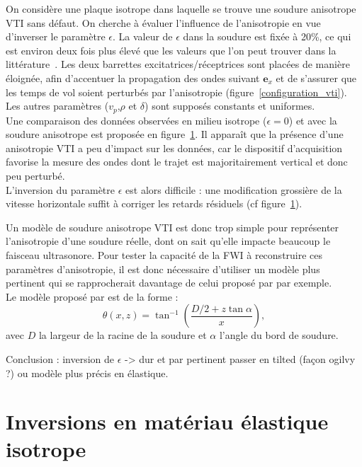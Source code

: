 On considère une plaque isotrope dans laquelle se trouve une soudure anisotrope VTI sans défaut. On cherche à évaluer l'influence de l'anisotropie en vue d'inverser le paramètre $\epsilon$. La valeur de $\epsilon$ dans la soudure est fixée à 20\%, ce qui est environ deux fois plus élevé que les valeurs que l'on peut trouver dans la littérature~\citep{chassignole}. Les deux barrettes excitatrices/réceptrices sont placées de manière éloignée, afin d'accentuer la propagation des ondes suivant $\bm{e}_{x}$ et de s'assurer que les temps de vol soient perturbés par l'anisotropie (figure~\ref{configuration_vti}).\\
Les autres paramètres ($v_{p}$,$\rho$ et $\delta$) sont supposés constants et uniformes.\\

Une comparaison des données observées en milieu isotrope ($\epsilon = 0$) et avec la soudure anisotrope est proposée en figure~\ref{}. Il apparaît que la présence d'une anisotropie VTI a peu d'impact sur les données, car le dispositif d'acquisition favorise la mesure des ondes dont le trajet est majoritairement vertical et donc peu perturbé.\\
 L'inversion du paramètre $\epsilon$ est alors difficile : une modification grossière de la vitesse horizontale suffit à corriger les retards résiduels (cf figure~\ref{}).
 
 
Un modèle de soudure anisotrope VTI est donc trop simple pour représenter l'anisotropie d'une soudure réelle, dont on sait qu'elle impacte beaucoup le faisceau ultrasonore. Pour tester la capacité de la FWI à reconstruire ces paramètres d'anisotropie, il est donc nécessaire d'utiliser un modèle plus pertinent qui se rapprocherait davantage de celui proposé par \cite{ogilvy} par exemple.\\

Le modèle proposé par \cite{ogilvy} est de la forme : 
\begin{equation}
	\theta(x,z) = \tan^{-1}\left( \frac{D/2 + z\tan\alpha}{x} \right),
\end{equation}
avec $D$ la largeur de la racine de la soudure et $\alpha$  l'angle du bord de soudure.

 Conclusion : inversion de $\epsilon$ -> dur et par pertinent
passer en tilted (façon ogilvy ?) ou modèle plus précis en élastique.

\section{Inversions en matériau élastique isotrope}





